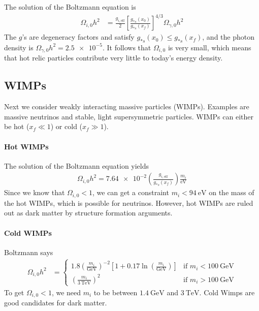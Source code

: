The solution of the Boltzmann equation is
	\begin{align*}
		\Omega_{i,0} h^2
		&= \frac{ g_{i,\text{eff}} }{2}  \left[ \frac{g_{*s}(x_0)}{g_{*s}(x_f)} \right]^{4/3} \Omega_{\gamma, 0} h^2
	\end{align*}
The $g$'s are degeneracy factors and satisfy $g_{*s}(x_0) \leq g_{*s}(x_f)$, and the photon density is $\Omega_{\gamma,0} h^2 = \num{2.5e-5}$. It follows that $\Omega_{i,0}$ is very small, which means that hot relic particles contribute very little to today's energy density.

\subsection{WIMPs}
Next we consider weakly interacting massive particles (WIMPs). Examples are massive neutrinos and stable, light supersymmetric particles. WIMPs can either be hot ($x_f \ll 1$) or cold ($x_f \gg 1$).

\paragraph*{Hot WIMPs}
The solution of the Boltzmann equation yields
\begin{align*}
	\Omega_{i,0} h^2 = \num{7.64e-2} 
	\left( \frac{g_{i,\text{eff}}}{g_{*s}(x_f)} \right)
	\frac{m_i}{\si{\eV}}
\end{align*}
Since we know that $\Omega_{i,0} < 1$, we can get a constraint $m_i < \SI{94}{\eV}$ on the mass of the hot WIMPs, which is possible for neutrinos. However, hot WIMPs are ruled out as dark matter by structure formation arguments.

\paragraph*{Cold WIMPs}
Boltzmann says
\begin{align*}
	\Omega_{i,0} h^2
	&= \begin{cases}
	1.8 \left( \frac{m_i}{\si{\GeV}} \right)^{-2} 
	\left[ 1 + 0.17 \ln\left( \frac{m_i}{\si{\GeV}} \right) \right]
	& \text{if } m_i < \SI{100}{\GeV}\\
	\left( \frac{m_i}{\SI{3}{\TeV}} \right)^2
	& \text{if } m_i > \SI{100}{\GeV}
	\end{cases}
\end{align*}
To get $\Omega_{i,0} < 1$, we need $m_i$ to be between $\SI{1.4}{\GeV}$ and $\SI{3}{\TeV}$. Cold Wimps are good candidates for dark matter.

